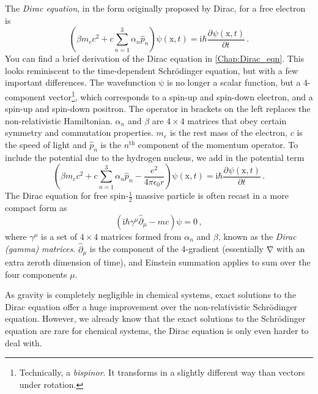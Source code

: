 \documentclass{article}
\theoremstyle{plain}\theoremheaderfont{\normalfont\itshape}\theorembodyfont{\rmfamily}\theoremseparator{.}\newtheorem*{rem}{Remark}\newtheorem*{ex}{Example}\newtheorem*{proof}{Proof}\newtheorem*{altp}{Alternative proof}
\theoremstyle{plain}\theoremheaderfont{\normalfont\bfseries}\theorembodyfont{\rmfamily}\theoremseparator{.}\newtheorem{thm}{Theorem}[section]\newtheorem{lem}[thm]{Lemma}\newtheorem{prop}[thm]{Proposition}\newtheorem*{cor}{Corollary}\newtheorem{defn}[thm]{Definition}\newtheorem{clm}[thm]{Claim}\newtheorem{clminproof}{Claim}
\theoremstyle{break}\theoremheaderfont{\normalfont\itshape}\theorembodyfont{\rmfamily}\theoremseparator{.\medskip}\newtheorem*{proofskip}{Proof}\newtheorem*{exs}{Examples}\newtheorem*{rems}{Remarks}
\theoremstyle{break}\theoremheaderfont{\normalfont\bfseries}\theorembodyfont{\rmfamily}\theoremseparator{.\medskip}\newtheorem{lemskip}[thm]{Lemma}\newtheorem{defnskip}[thm]{Definition}\newtheorem{propskip}[thm]{Proposition}\newtheorem{thmskip}[thm]{Theorem}
\numberwithin{equation}{section}
\newcommand{\ii}{\mathrm{i}}
\newcommand{\pdv}[3][]{\frac{\partial^{#1} #2}{{\partial #3}^{#1}}}
\newcommand{\vb}[1]{\bm{\mathrm{#1}}}
\newcommand{\grad}{\vb{\nabla}}
\begin{document}
    The \textit{Dirac equation}, in the form originally proposed by Dirac, for a free electron is
    \begin{equation}
        \left(\beta m_e c^2 + c\sum_{n=1}^{3}\alpha_n\hat{p}_n\right)\vb{\psi}(\vb{x},t)=\ii\hbar\pdv{\psi(\vb{x},t)}{t}\,.
    \end{equation}
    You can find a brief derivation of the Dirac equation in \cref{Chap:Dirac_eqn}. This looks reminiscent to the time-dependent Schr\"{o}dinger equation, but with a few important differences. The wavefunction \(\vb{\psi}\) is no longer a scalar function, but a 4-component vector\footnote{Technically, a \textit{bispinor}. It transforms in a slightly different way than vectors under rotation.}, which corresponds to a spin-up and spin-down electron, and a spin-up and spin-down positron. The operator in brackets on the left replaces the non-relativistic Hamiltonian. \(\alpha_n\) and \(\beta\) are \(4\times 4\) matrices that obey certain symmetry and commutation properties. \(m_e\) is the rest mass of the electron, \(c\) is the speed of light and \(\hat{p}_n\) is the \(n^{\text{th}}\) component of the momentum operator. To include the potential due to the hydrogen nucleus, we add in the potential term
    \begin{equation}
        \left(\beta m_e c^2 + c\sum_{n=1}^{3}\alpha_n\hat{p}_n-\frac{e^2}{4\pi\epsilon_0 r}\right)\vb{\psi}(\vb{x},t)=\ii\hbar\pdv{\psi(\vb{x},t)}{t}\,.
    \end{equation}
    The Dirac equation for free spin-\(\frac{1}{2}\) massive particle is often recast in a more compact form as
    \begin{equation}
        \left(\ii\hbar\gamma^\mu\hat{\partial}_\mu-mc\right)\vb{\psi}=\vb{0}\,,
    \end{equation}
    where \(\gamma^\mu\) is a set of \(4\times 4\) matrices formed from \(\alpha_n\) and \(\beta\), known as the \textit{Dirac (gamma) matrices}. \(\hat{\partial}_{\mu}\) is the component of the 4-gradient (essentially \(\grad\) with an extra zeroth dimension of time), and Einstein summation applies to sum over the four components \(\mu\).

    As gravity is completely negligible in chemical systems, exact solutions to the Dirac equation offer a huge improvement over the non-relativistic Schr\"{o}dinger equation. However, we already know that the exact solutions to the Schr\"{o}dinger equation are rare for chemical systems, the Dirac equation is only even harder to deal with.
\end{document}
